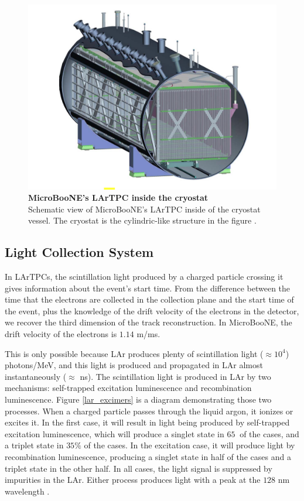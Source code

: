 \begin{figure}[h!]
    \begin{center}
        \includegraphics[scale=0.35]{Figures/uboone_cryo.png}
        \caption[MicroBooNE's LArTPC inside the cryostat]{{\textbf{MicroBooNE's LArTPC inside the cryostat}} \\ Schematic view of MicroBooNE's LArTPC inside of the cryostat vessel. The cryostat is the cylindric-like structure in the figure \cite{microboone_design}.}
        \label{uboone_cryo} 
    \end{center}
\end{figure}

\subsection{Light Collection System}

In LArTPCs, the scintillation light produced by a charged particle crossing it gives information about the event's start time. From the difference between the time that the electrons are collected in the collection plane and the start time of the event, plus the knowledge of the drift velocity of the electrons in the detector, we recover the third dimension of the track reconstruction. In MicroBooNE, the drift velocity of the electrons is $1.14$ m/ms. 

This is only possible because LAr produces plenty of scintillation light ($\approx 10^4 $) photons/MeV, and this light is produced and propagated in LAr almost instantaneously ($\approx$ ns). The scintillation light is produced in LAr by two mechanisms: self-trapped excitation luminescence and recombination luminescence. Figure \ref{lar_excimers} is a diagram demonstrating those two processes. When a charged particle passes through the liquid argon, it ionizes or excites it. In the first case, it will result in light being produced by self-trapped excitation luminescence, which will produce a singlet state in $65\  $ of the cases, and a triplet state in $35\%$ of the cases. In the excitation case, it will produce light by recombination luminescence, producing a singlet state in half of the cases and a triplet state in the other half. In all cases, the light signal is suppressed by impurities in the LAr. Either process produces light with a peak at the $128$ nm wavelength \cite{lar_excimers}.
 
